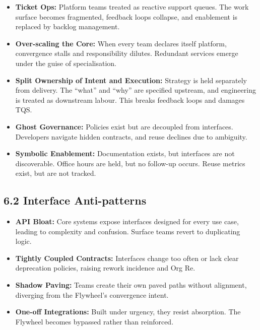 \documentclass[12pt]{article}
\begin{document}
\begin{itemize}
    \item \textbf{Ticket Ops:} Platform teams treated as reactive support queues. The work surface becomes fragmented, feedback loops collapse, and enablement is replaced by backlog management.
    
    \item \textbf{Over-scaling the Core:} When every team declares itself platform, convergence stalls and responsibility dilutes. Redundant services emerge under the guise of specialisation.
    
    \item \textbf{Split Ownership of Intent and Execution:} Strategy is held separately from delivery. The “what” and “why” are specified upstream, and engineering is treated as downstream labour. This breaks feedback loops and damages TQS.
    
    \item \textbf{Ghost Governance:} Policies exist but are decoupled from interfaces. Developers navigate hidden contracts, and reuse declines due to ambiguity.
    
    \item \textbf{Symbolic Enablement:} Documentation exists, but interfaces are not discoverable. Office hours are held, but no follow-up occurs. Reuse metrics exist, but are not tracked.
\end{itemize}

\subsection*{6.2 Interface Anti-patterns}

\begin{itemize}
    \item \textbf{API Bloat:} Core systems expose interfaces designed for every use case, leading to complexity and confusion. Surface teams revert to duplicating logic.
    
    \item \textbf{Tightly Coupled Contracts:} Interfaces change too often or lack clear deprecation policies, raising rework incidence and Org Re.
    
    \item \textbf{Shadow Paving:} Teams create their own paved paths without alignment, \\
    diverging from the Flywheel’s convergence intent.
    
    \item \textbf{One-off Integrations:} Built under urgency, they resist absorption. The Flywheel becomes bypassed rather than reinforced.
\end{itemize}
\end{document}

